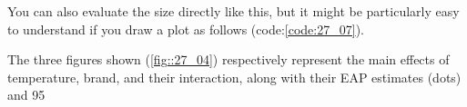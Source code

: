 \documentclass{ltjbook}
\begin{document}
You can also evaluate the size directly like this, but it might be particularly easy to understand if you draw a plot as follows (code:\ref{code:27_07}).

The three figures shown (\ref{fig::27_04}) respectively represent the main effects of temperature, brand, and their interaction, along with their EAP estimates (dots) and 95%

\end{document}
